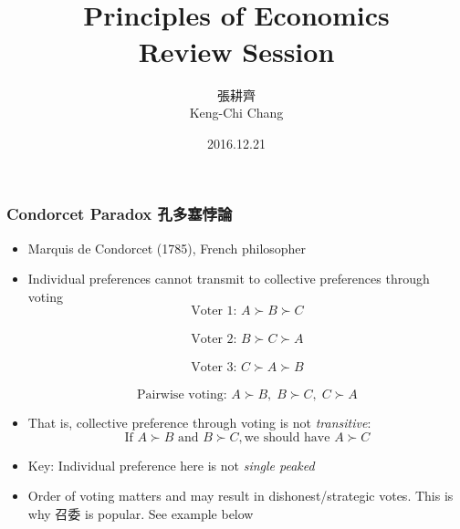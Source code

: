 \documentclass[12pt, xcolor=dvipsnames]{beamer}
\title{\bf{\Huge {}\\[-2mm] Principles of Economics \\[2mm] Review Session}}
\author{{\Large 張耕齊\\[2mm] Keng-Chi Chang}}
\institute{{}\\[-7mm]\footnotesize\tt{<r03323070@ntu.edu.tw>}\\[2mm]}
\date{\large 2016.12.21}
\begin{document}
\fontsize{12}{14pt}\selectfont

\begin{frame}
\titlepage
\end{frame}





\begin{frame}
\frametitle{\bf Condorcet Paradox 孔多塞悖論}
\begin{itemize}
\item Marquis de Condorcet (1785), French philosopher
\item Individual preferences cannot transmit to collective preferences through voting
\[\mbox{Voter 1: }A\succ B \succ C\]\\[-8mm]
\[\mbox{Voter 2: }B\succ C \succ A\]\\[-8mm]
\[\mbox{Voter 3: }C\succ A \succ B\]\\[-8mm]
\[\mbox{Pairwise voting: }A\succ B,\; B \succ C, \; C\succ A\]
\item That is, collective preference through voting is not {\it transitive}: 
\[\mbox{If }A\succ B \mbox{ and } B \succ C, \mbox{we should have }A\succ C\]
\item Key: Individual preference here is not {\it single peaked}
\item Order of voting matters and may result in dishonest/strategic votes. This is why 召委 is popular. See example below
\end{itemize}
\end{frame}
\end{document}
